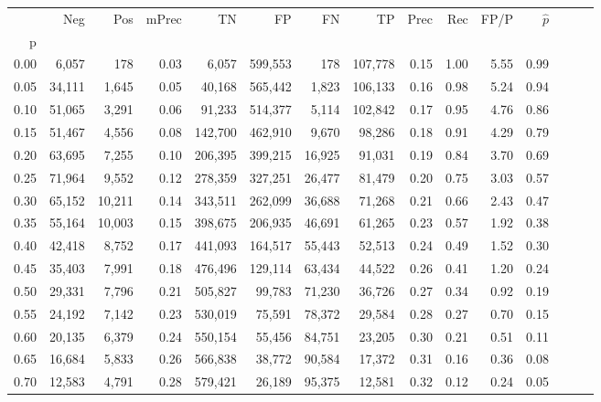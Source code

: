 \begin{tabular}{rrrrrrrrrrrrrrr}
\toprule
{} &     Neg &     Pos & mPrec &       TN &       FP &       FN &       TP &  Prec &   Rec &  FP/P & $\hat{p}$ \\
p    &         &         &       &          &          &          &          &       &       &       &           \\
\midrule
0.00 &   6,057 &     178 &  0.03 &    6,057 &  599,553 &      178 &  107,778 &  0.15 &  1.00 &  5.55 &      0.99 \\
0.05 &  34,111 &   1,645 &  0.05 &   40,168 &  565,442 &    1,823 &  106,133 &  0.16 &  0.98 &  5.24 &      0.94 \\
0.10 &  51,065 &   3,291 &  0.06 &   91,233 &  514,377 &    5,114 &  102,842 &  0.17 &  0.95 &  4.76 &      0.86 \\
0.15 &  51,467 &   4,556 &  0.08 &  142,700 &  462,910 &    9,670 &   98,286 &  0.18 &  0.91 &  4.29 &      0.79 \\
0.20 &  63,695 &   7,255 &  0.10 &  206,395 &  399,215 &   16,925 &   91,031 &  0.19 &  0.84 &  3.70 &      0.69 \\
0.25 &  71,964 &   9,552 &  0.12 &  278,359 &  327,251 &   26,477 &   81,479 &  0.20 &  0.75 &  3.03 &      0.57 \\
0.30 &  65,152 &  10,211 &  0.14 &  343,511 &  262,099 &   36,688 &   71,268 &  0.21 &  0.66 &  2.43 &      0.47 \\
0.35 &  55,164 &  10,003 &  0.15 &  398,675 &  206,935 &   46,691 &   61,265 &  0.23 &  0.57 &  1.92 &      0.38 \\
0.40 &  42,418 &   8,752 &  0.17 &  441,093 &  164,517 &   55,443 &   52,513 &  0.24 &  0.49 &  1.52 &      0.30 \\
0.45 &  35,403 &   7,991 &  0.18 &  476,496 &  129,114 &   63,434 &   44,522 &  0.26 &  0.41 &  1.20 &      0.24 \\
0.50 &  29,331 &   7,796 &  0.21 &  505,827 &   99,783 &   71,230 &   36,726 &  0.27 &  0.34 &  0.92 &      0.19 \\
0.55 &  24,192 &   7,142 &  0.23 &  530,019 &   75,591 &   78,372 &   29,584 &  0.28 &  0.27 &  0.70 &      0.15 \\
0.60 &  20,135 &   6,379 &  0.24 &  550,154 &   55,456 &   84,751 &   23,205 &  0.30 &  0.21 &  0.51 &      0.11 \\
0.65 &  16,684 &   5,833 &  0.26 &  566,838 &   38,772 &   90,584 &   17,372 &  0.31 &  0.16 &  0.36 &      0.08 \\
0.70 &  12,583 &   4,791 &  0.28 &  579,421 &   26,189 &   95,375 &   12,581 &  0.32 &  0.12 &  0.24 &      0.05 \\

\end{tabular}
